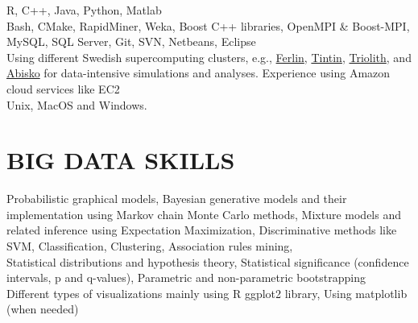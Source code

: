 \documentclass[margin, 10pt]{res} %
\begin{document}
\begin{resume}
{\bf \color{Brown}{Languages:}} 
R, C++, Java, Python, Matlab\\
{\bf \color{Brown}{Misc Tools:}} Bash, CMake, RapidMiner, Weka, Boost C++ libraries, OpenMPI \& Boost-MPI, MySQL, SQL Server, Git, SVN, Netbeans, Eclipse \\
{\bf \color{Brown}{HPC Clusters:}} Using different Swedish supercomputing clusters, e.g., \href{https://www.pdc.kth.se/resources/computers/historical-computers/ferlin}{Ferlin}, \href{http://www.uppmax.uu.se/}{Tintin}, \href{https://www.nsc.liu.se/systems/triolith/}{Triolith}, and \href{http://www.hpc2n.umu.se/resources/abisko}{Abisko} for data-intensive simulations and analyses. Experience using Amazon cloud services like EC2 \\
{\bf \color{Brown}{Operating Systems:}} Unix, MacOS and Windows.

\section{BIG DATA SKILLS}
{\bf \color{Brown}{Machine Learning Skills:}} 
Probabilistic graphical models, Bayesian generative models and their implementation using Markov chain Monte Carlo methods, Mixture models and related inference using Expectation Maximization, Discriminative methods like SVM, Classification, Clustering, Association rules mining,   \\
{\bf \color{Brown}{Statistical Theory:}} Statistical distributions and hypothesis theory, Statistical significance (confidence intervals, p and q-values), Parametric and non-parametric bootstrapping \\
{\bf \color{Brown}{Statistical Visualization and reporting:}} Different types of visualizations mainly using R ggplot2 library, Using matplotlib (when needed)


\end{resume}
\end{document}
